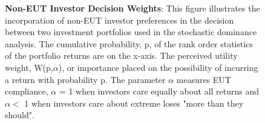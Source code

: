 \clearpage
%		
%		
\begin{figure}[htb]
	\centering
	\caption{{\bf These figures show the smoothed kernel smoothed density and empirical CDFs calculated for the returns to the AV and SV managed US equity portfolios. These are examples of the estimated distributions are used in the stochastic dominance tests which follow.}} \label{fig:kd_graph}
	\begin{subfigure}{\textwidth}
		
	\end{subfigure}
	
	\begin{subfigure}{\textwidth}
		
	\end{subfigure}
	
	\begin{subfigure}{\textwidth}
		
	\end{subfigure}
	
	\begin{subfigure}{\textwidth}
		
	\end{subfigure}
\end{figure}
\clearpage
\begin{figure}[htb]
	\centering
	\caption{{\bf Non-EUT Investor Decision Weights}: This figure illustrates the incorporation of non-EUT investor preferences in the decision between two investment portfolios used in the stochastic dominance analysis. The cumulative probability, p, of the rank order statistics of the portfolio returns are on the x-axis. The perceived utility weight, W(p,$\alpha$), or importance placed on the possibility of incurring a return with probability p. The parameter $\alpha$ measures EUT compliance, $\alpha$ = 1 when investors care equally about all returns and $\alpha <$ 1 when investors care about extreme loses "more than they should".} \label{fig:sd_ill_graph}
	
\end{figure}
\clearpage